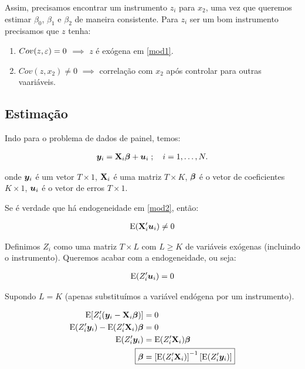 \documentclass[11pt, oneside, a4paper, article]{article}
\numberwithin{equation}{section}
\begin{document}
\begin{description}
Assim, precisamos encontrar um instrumento $z_{i}$ para $x_{2}$, uma vez que queremos estimar $\beta_{0}$, $\beta_{1}$ e $\beta_{2}$ de maneira consistente.
Para $z_{i}$ ser um bom instrumento precisamos que $z$ tenha:

\begin{enumerate}\itemsep0pt
\item $Cov(z, \varepsilon) = 0$ $\implies$  $z$ é exógena em \eqref{mod1}.
\item $Cov(z, x_{2}) \neq 0$ $\implies$  correlação com $x_{2}$ após controlar para outras vaariáveis.
\end{enumerate}

\subsection{Estimação}

Indo para o problema de dados de painel, temos:

\vspace{-1 em}
\begin{align} \label{mod2}
	\boldsymbol{y}_{i} = \mathbf{X}_{i} \boldsymbol{\beta} + \boldsymbol{u}_{i}
	\; ; \quad i = 1, \dots, N.
\end{align}

\noindent
onde 
$\boldsymbol{y}_{i}$ é um vetor $T \times 1$,
$\mathbf{X}_{i}$ é uma matriz $T \times K$,
$\boldsymbol{\beta}$ é o vetor de coeficientes $K \times 1$,
$\boldsymbol{u}_{i}$ é o vetor de erros $T \times 1$.

Se é verdade que há endogeneidade em \eqref{mod2}, então:

\vspace{-1 em}
\begin{align*}
	\text{E}(\mathbf{X}_{i}^{\prime} \boldsymbol{u}_{i}) \neq 0
\end{align*}

Definimos $Z_{i}$ como uma matriz $T \times L$ com $L \geq K$ de variáveis exógenas (incluindo o instrumento).
Queremos acabar com a endogeneidade, ou seja:

\vspace{-1 em}
\begin{align*}
	\text{E}(Z_{i}^{\prime} \boldsymbol{u}_{i}) = 0
\end{align*}

Supondo $L = K$ (apenas substituímos a variável endógena por um instrumento).

\vspace{-1 em}
\begin{align*}
\E[ Z_{i}^{\prime} ( \yvec_{i} - \Xmat_{i} \betavec ) ] &= 0
\\
\E( Z_{i}^{\prime} \yvec_{i} ) - \E( Z_{i}^{\prime} \Xmat_{i} ) \betavec &= 0
\\
\E( Z_{i}^{\prime} \yvec_{i} ) &= \E( Z_{i}^{\prime} \Xmat_{i} ) \betavec
\\
\Aboxed{
\betavec &=
\left[ \E( Z_{i}^{\prime} \Xmat_{i} ) \right]^{-1}
\left[ \E( Z_{i}^{\prime} \yvec_{i} ) \right]
}
\end{align*}


\end{description}
\end{document}

